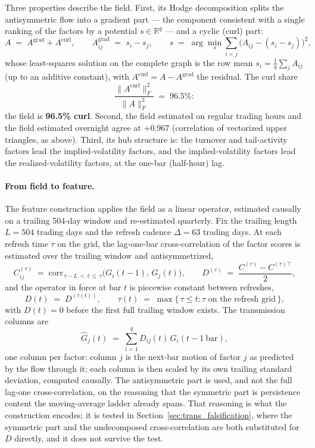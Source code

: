 Three properties describe the field. First, its Hodge decomposition splits
the antisymmetric flow into a gradient part --- the component consistent with
a single ranking of the factors by a potential $s \in \mathbb{R}^q$ --- and a
cyclic (curl) part:
\[
A \;=\; A^{\mathrm{grad}} + A^{\mathrm{curl}},
\qquad
A^{\mathrm{grad}}_{ij} \;=\; s_i - s_j,
\qquad
s \;=\; \arg\min_{s} \sum_{i<j} \bigl( A_{ij} - (s_i - s_j) \bigr)^2,
\]
whose least-squares solution on the complete graph is the row mean
$s_i = \frac{1}{q} \sum_j A_{ij}$ (up to an additive constant), with
$A^{\mathrm{curl}} = A - A^{\mathrm{grad}}$ the residual. The curl share
\[
\frac{\lVert A^{\mathrm{curl}} \rVert_F^2}{\lVert A \rVert_F^2}
\;=\; 96.5\% :
\]
the field is \textbf{96.5\% curl}. Second, the field estimated on regular trading hours and the field estimated
overnight agree at $+0.967$ (correlation of vectorized upper triangles, as
above). Third, its hub structure is: the turnover and tail-activity factors
lead the implied-volatility factors, and the implied-volatility factors lead
the realized-volatility factors, at the one-bar (half-hour) lag.

\paragraph{From field to feature.}
The feature construction applies the field as a linear operator, estimated
causally on a trailing 504-day window and re-estimated quarterly. Fix the
trailing length $L = 504$ trading days and the refresh cadence $\Delta = 63$
trading days. At each refresh time $\tau$ on the grid, the lag-one-bar
cross-correlation of the factor scores is estimated over the trailing window
and antisymmetrized,
\[
C^{(\tau)}_{ij} \;=\;
\mathrm{corr}_{\,\tau - L \,<\, t \,\le\, \tau}
\bigl( G_i(t-1),\, G_j(t) \bigr),
\qquad
D^{(\tau)} \;=\; \frac{C^{(\tau)} - C^{(\tau)\top}}{2},
\]
and the operator in force at bar $t$ is piecewise constant between refreshes,
\[
D(t) \;=\; D^{(\tau(t))},
\qquad
\tau(t) \;=\; \max\{\, \tau \le t : \tau \text{ on the refresh grid} \,\},
\]
with $D(t) = 0$ before the first full trailing window exists. The
transmission columns are
\[
\hat G_j(t) \;=\; \sum_{i=1}^{q} D_{ij}(t)\, G_i(t - 1\ \mathrm{bar}),
\]
one column per factor: column $j$ is the next-bar motion of factor $j$ as
predicted by the flow through it; each column is then scaled by its own
trailing standard deviation, computed causally. The antisymmetric part is
used, and not the full lag-one cross-correlation, on the reasoning that the
symmetric part is persistence content the moving-average ladder already
spans. That reasoning is what the construction encodes; it is tested in
Section~\ref{sec:trans_falsification}, where the symmetric part and the
undecomposed cross-correlation are both substituted for $D$ directly, and
it does not survive the test.

